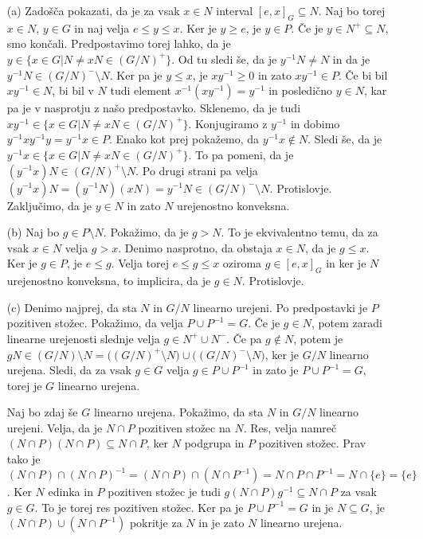 \documentclass[a4paper, 12pt]{article}
\begin{document}
\begin{enumerate}
\item[(a)]Zadošča pokazati, da je za vsak $x\in N$ interval $[e,x]_G\subseteq N$. Naj bo torej $x\in N$, $y\in G$ in naj velja $e\le y\le x$. Ker je $y\ge e$, je $y\in P$. Če je $y\in N^+ \subseteq N$, smo končali. Predpostavimo torej lahko, da je $y\in \{x\in G| N \neq xN \in (G/N)^+\}$. Od tu sledi še, da je $y^{-1}N \neq N$ in da je $y^{-1}N\in (G/N)^- \setminus N$. Ker pa je $y\le x$, je $xy^{-1}\ge 0$ in zato $xy^{-1} \in P$. Če bi bil $xy^{-1}\in N$, bi bil v $N$ tudi element $x^{-1} (xy^{-1}) = y^{-1}$ in posledično $y\in N$, kar pa je v nasprotju z našo predpostavko. Sklenemo, da je tudi $xy^{-1} \in \{x\in G|N\neq xN \in (G/N)^+\}$. Konjugiramo z $y^{-1}$ in dobimo $y^{-1}xy^{-1}y = y^{-1} x \in P$. Enako kot prej pokažemo, da $y^{-1}x \notin N$. Sledi še, da je $y^{-1}x \in \{x\in G| N \neq xN \in (G/N)^+\}$. To pa pomeni, da je $(y^{-1}x)N \in (G/N)^+\setminus N$. Po drugi strani pa velja $(y^{-1}x)N = (y^{-1}N)(xN) = y^{-1}N\in (G/N)^- \setminus N$. Protislovje. Zaključimo, da je $y\in N$ in zato $N$ urejenostno konveksna.

\item[(b)] Naj bo $g\in P\setminus N$. Pokažimo, da je $g> N$. To je ekvivalentno temu, da za vsak $x\in N$ velja $g> x$. Denimo nasprotno, da obstaja $x\in N$, da je $g\le x$. Ker je $g\in P$, je $e \le g$. Velja torej $e \le g \le x$  oziroma $g\in [e,x]_G$  in ker je  $N$ urejenostno konveksna, to implicira, da je $g\in N$. Protislovje.

\item[(c)] Denimo najprej, da sta $N$ in $G/N$ linearno urejeni. Po predpostavki je $P$ pozitiven stožec. Pokažimo, da velja $P\cup P^{-1} = G$. Če je $g\in N$, potem zaradi linearne urejenosti slednje velja $g\in N^+ \cup N^-$. Če pa $g\notin N$, potem je $gN\in (G/N)\setminus N= \big((G/N)^+ \setminus N\big) \cup \big((G/N)^- \setminus N\big)$, ker je $G/N$ linearno urejena. Sledi, da za vsak $g\in G$ velja $g\in P\cup P^{-1}$ in zato je  $P\cup P^{-1} = G$, torej je $G$ linearno urejena.

Naj bo zdaj še $G$ linearno urejena. Pokažimo, da sta $N$ in $G/N$ linearno urejeni. Velja, da je $N\cap P$ pozitiven stožec na $N$. Res, velja namreč $(N\cap P)(N\cap P)\subseteq N\cap P$, ker $N$ podgrupa in $P$ pozitiven stožec. Prav tako je $(N\cap P) \cap (N\cap P)^{-1}  = (N\cap P ) \cap (N\cap P^{-1}) = N \cap P \cap P^{-1} = N\cap \{e\} = \{e\}$. Ker $N$ edinka in $P$ pozitiven stožec je tudi $g(N\cap P) g^{-1} \subseteq N\cap P$ za vsak $g\in G$. To je torej res pozitiven stožec. Ker pa je $P\cup P^{-1} = G$ in je $N\subseteq G$, je $(N\cap P) \cup (N\cap P^{-1})$ pokritje za $N$ in je zato $N$ linearno urejena.


\end{enumerate}
\end{document}
